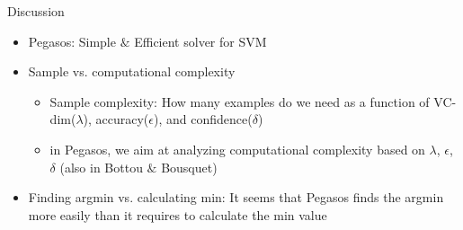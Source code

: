 \begin{frame}{Discussion}
    \begin{itemize}
        \item Pegasos: Simple $\&$ Efficient solver for SVM
        \item Sample vs. computational complexity
            \begin{itemize}
                \item Sample complexity: How many examples do we need as a function of VC-dim($\lambda$), accuracy($\epsilon$), and confidence($\delta$)
                \item in Pegasos, we aim at analyzing computational complexity based on $\lambda$, $\epsilon$, $\delta$ (also in Bottou $\&$ Bousquet)
            \end{itemize}
        \item Finding argmin vs. calculating min: It seems that Pegasos finds the argmin more easily than it requires to calculate the min value
    \end{itemize}
\end{frame}

